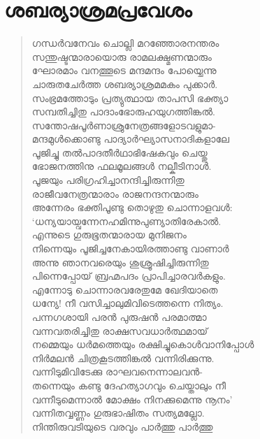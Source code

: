 \section{ശബര്യാശ്രമപ്രവേശം}

\begin{verse}
ഗന്ധര്‍വനേവം ചൊല്ലി മറഞ്ഞോരനന്തരം\\
സന്തുഷ്ടന്മാരായൊരു രാമലക്ഷ്മണന്മാരും\\
ഘോരമാം വനത്തൂടെ മന്ദമന്ദം പോയ്ചെന്നു\\
ചാരുതചേര്‍ത്ത ശബര്യാശ്രമമകം പുക്കാര്‍.\\
സംഭ്രമത്തോടും പ്രത്യുത്ഥായ താപസി ഭക്ത്യാ\\
സമ്പതിച്ചിതു പാദാംഭോരുഹയുഗത്തിങ്കല്‍.\\
സന്തോഷപൂര്‍ണാശ്രുനേത്രങ്ങളോടവളുമാ-\\
മന്ദമുള്‍ക്കൊണ്ടു പാദ്യാര്‍ഘ്യാസനാദികളാലേ\\
പൂജിച്ചു തല്‍പാദതീര്‍ഥാഭിഷേകവും ചെയ്തു\\
ഭോജനത്തിനു ഫലമൂലങ്ങള്‍ നല്കീടിനാള്‍.\\
പൂജയും പരിഗ്രഹിച്ചാനന്ദിച്ചിരുന്നിതു\\
രാജീവനേത്രന്മാരാം രാജനന്ദനന്മാരും\\
അന്നേരം ഭക്തിപൂണ്ടു തൊഴുതു ചൊന്നാളവള്‍:\\
‘ധന്യയായ്വന്നേനഹമിന്നുപുണ്യാതിരേകാല്‍.\\
എന്നുടെ ഗുരുഭൂതന്മാരായ മുനിജനം\\
നിന്നെയും പൂജിച്ചനേകായിരത്താണ്ടു വാണാര്‍\\
അന്നു ഞാനവരെയും ശുശ്രൂഷിച്ചിരുന്നിതു\\
പിന്നെപ്പോയ് ബ്രഹ്മപദം പ്രാപിച്ചാരവര്‍കളും.\\
എന്നോടു ചൊന്നാരവരേതുമേ ഖേദിയാതെ\\
ധന്യേ! നീ വസിച്ചാലുമിവിടെത്തന്നെ നിത്യം.\\
പന്നഗശായി പരന്‍ പുരുഷന്‍ പരമാത്മാ\\
വന്നവതരിച്ചിതു രാക്ഷസവധാര്‍ത്ഥമായ്\\
നമ്മെയും ധര്‍മത്തെയും രക്ഷിച്ചുകൊള്‍വാനിപ്പോള്‍\\
നിര്‍മലന്‍ ചിത്രകൂടത്തിങ്കല്‍ വന്നിരിക്കുന്നു.\\
വന്നിടുമിവിടേക്കു രാഘവനെന്നാലവന്‍-\\
തന്നെയും കണ്ടു ദേഹത്യാഗവും ചെയ്താലും നീ\\
വന്നീടുമെന്നാല്‍ മോക്ഷം നിനക്കുമെന്നു നൂനം’\\
വന്നിതവ്വണ്ണം ഗുരുഭാഷിതം സത്യമല്ലോ.\\
നിന്തിരുവടിയുടെ വരവും പാര്‍ത്തു പാര്‍ത്തു\\

\end{verse}
